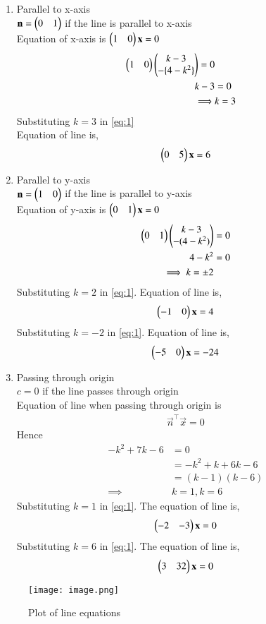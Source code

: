 \documentclass[journal,12pt,twocolumn]{IEEEtran}
\begin{document}
\begin{enumerate}[label=\emph{\alph*)}]
\item Parallel to x-axis\\
$\mathbf{n}=\begin{pmatrix}0 & 1\end{pmatrix}$ if the line is parallel to x-axis\\
Equation of x-axis is $\begin{pmatrix}1 & 0\end{pmatrix}\mathbf{x}=0$\
\begin{equation}
\begin{split}
  \begin{pmatrix}1 & 0\end{pmatrix}\begin{pmatrix}k-3\\-\{4-k^2\}\end{pmatrix} = 0 \label{eq1}\\
  k-3&= 0\\
\implies &k=3
\end{split}
\end{equation}
Substituting $k=3$ in \eqref{eq:1}\\
Equation of line is,
\begin{align}
     \begin{pmatrix}0 & 5\end{pmatrix}\mathbf{x}=6
\end{align}
 
\item Parallel to y-axis\\
$\mathbf{n}=\begin{pmatrix}1 & 0\end{pmatrix}$ if the line is parallel to y-axis\\
Equation of y-axis is $\begin{pmatrix}0 & 1\end{pmatrix}\mathbf{x}=0$
\begin{equation} \label{eq1}
\begin{split}
\begin{pmatrix}0 & 1\end{pmatrix}\begin{pmatrix}k-3\\-(4-k^2)\end{pmatrix} &= 0\\
 4-k^2 & =0\\
 \implies k=\pm2
\end{split}
\end{equation}
Substituting $k=2$ in \eqref{eq:1}.
Equation of line is,
\begin{align}
     \begin{pmatrix}-1 & 0\end{pmatrix}\mathbf{x}= 4
\end{align}
Substituting $k=-2$ in \eqref{eq:1}.
Equation of line is,
\begin{align}
  \begin{pmatrix}-5 & 0\end{pmatrix}\mathbf{x}=-24
\end{align}
\item Passing through origin\\
${c = 0}$ \hspace{4mm}if the line passes through origin\\
Equation of line when passing through origin is 
\begin{align}
\vec{n}^\top\vec{x}=0
\end{align}
Hence
\begin{equation} \label{eq1}
\begin{split}
-k^2+7k-6 & = 0 \\
 & = -k^2+k+6k-6\\
 & = (k-1)(k-6)\\
 \implies&k=1, k=6
\end{split}
\end{equation}
Substituting $k=1$ in \eqref{eq:1}.
The equation of line is,
\begin{align}
\begin{pmatrix}-2&-3\end{pmatrix}\mathbf{x} = 0
\end{align}
Substituting $k=6$ in \eqref{eq:1}.
The equation of line is,
\begin{align}
  \begin{pmatrix}3 & 32\end{pmatrix}\mathbf{x} = 0
\end{align}
\end{enumerate}
\begin{figure}[!h]
         \centering
         \texttt{[image: image.png]}
         \caption{Plot of line equations}
         \label{fig:x cubed graph}
\end{figure}
\end{document}
